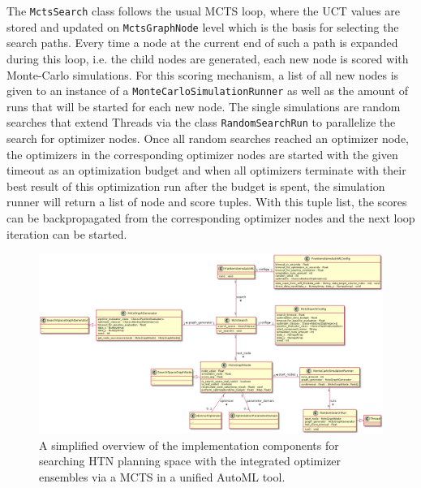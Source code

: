 The \texttt{MctsSearch} class follows the usual MCTS loop, where the UCT values are stored and updated on \texttt{MctsGraphNode} level which is the basis for selecting the search paths.
Every time a node at the current end of such a path is expanded during this loop, i.e. the child nodes are generated, each new node is scored with Monte-Carlo simulations.\newline
For this scoring mechanism, a list of all new nodes is given to an instance of a \texttt{MonteCarloSimulationRunner} as well as the amount of runs that will be started for each new node.
The single simulations are random searches that extend Threads via the class \texttt{RandomSearchRun} to parallelize the search for optimizer nodes.
Once all random searches reached an optimizer node, the optimizers in the corresponding optimizer nodes are started with the given timeout as an optimization budget and when all optimizers terminate with their best result of this optimization run after the budget is spent, the simulation runner will return a list of node and score tuples.
With this tuple list, the scores can be backpropagated from the corresponding optimizer nodes and the next loop iteration can be started.

\begin{figure}[ht!]
    \centering
    \includegraphics[angle=90,origin=c,width=\textwidth,height=0.7\textheight,keepaspectratio]{gfx/Figures/Implementation/mcts/MctsAutoML.png}
    \caption{A simplified overview of the implementation components for searching HTN planning space with the integrated optimizer ensembles via a MCTS in a unified AutoML tool.}
    \label{fig:implementation:uml:mcts}
\end{figure}

